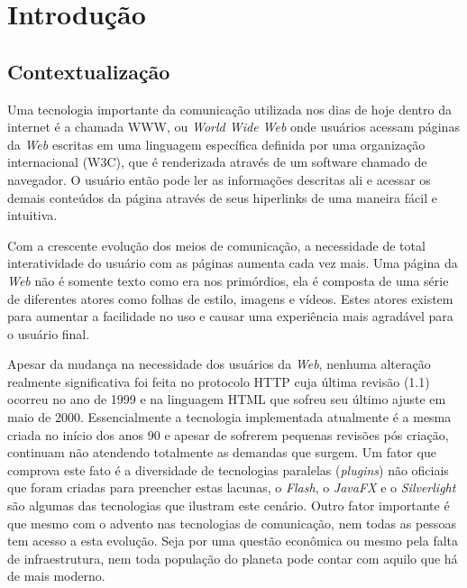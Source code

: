\documentclass[espaco=simples,appendix=Name]{abnt}
\begin{document}
\capa
\folhaderosto
\sumario

\newcommand{\ingles}[1]{\textsl{#1}}
\newcommand{\bibTeX}{bib\kern-.13ex\TeX}

\chapter{Introdução}

\begin{description}

\section{Contextualização}

\item \noindent Uma tecnologia importante da comunicação utilizada nos dias de hoje dentro da internet é a chamada WWW, ou \ingles{World Wide Web} onde usuários acessam páginas da \ingles{Web} escritas em uma linguagem específica definida por uma organização internacional (W3C), que é renderizada através de um software chamado de navegador. O usuário então pode ler as informações descritas ali e acessar os demais conteúdos da página através de seus hiperlinks de uma maneira fácil e intuitiva.

Com a crescente evolução dos meios de comunicação, a necessidade de total interatividade do usuário com as páginas aumenta cada vez mais. Uma página da \ingles{Web} não é somente texto como era nos primórdios, ela é composta de uma série de diferentes atores como folhas de estilo, imagens e vídeos. Estes atores existem para aumentar a facilidade no uso e causar uma experiência mais agradável para o usuário final.

Apesar da mudança na necessidade dos usuários da \ingles{Web}, nenhuma alteração realmente significativa foi feita no protocolo HTTP cuja última revisão (1.1) ocorreu no ano de 1999 e na linguagem HTML que sofreu seu último ajuste em maio de 2000. Essencialmente a tecnologia implementada atualmente é a mesma criada no início dos anos 90 e apesar de sofrerem pequenas revisões pós criação, continuam não atendendo totalmente as demandas que surgem. Um fator que comprova este fato é a diversidade de tecnologias paralelas (\ingles{plugins}) não oficiais que foram criadas para preencher estas lacunas, o \ingles{Flash}, o \ingles{JavaFX} e o \ingles{Silverlight} são algumas das tecnologias que ilustram este cenário. Outro fator importante é que mesmo com o advento nas tecnologias de comunicação, nem todas as pessoas tem acesso a esta evolução. Seja por uma questão econômica ou mesmo pela falta de infraestrutura, nem toda população do planeta pode contar com aquilo que há de mais moderno.


\end{description}
\end{document}
